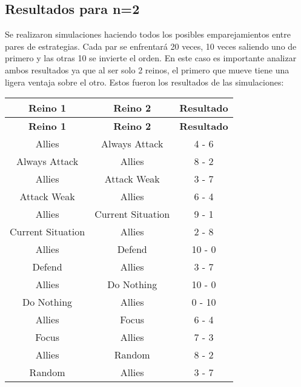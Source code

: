 \documentclass[11pt]{article}
\begin{document}
            \subsection{Resultados para n=2}
            Se realizaron simulaciones haciendo todos los posibles emparejamientos entre pares de estrategias. Cada par se enfrentará 
            20 veces, 10 veces saliendo uno de primero y las otras 10 se invierte el orden. En este caso es importante analizar ambos 
            resultados ya que al ser solo 2 reinos, el primero que mueve tiene una ligera ventaja sobre el otro. Estos fueron los 
            resultados de las simulaciones:

            \begin{longtable}{|c|c|c|}
                \hline \textbf{Reino 1}  & \textbf{Reino 2}  & \textbf{Resultado} \\ 
                \endfirsthead
                \hline \textbf{Reino 1}  & \textbf{Reino 2}  & \textbf{Resultado} \\ 
                \endhead
                \hline      Allies       &   Always Attack   &   4 - 6   \\
                \hline   Always Attack   &      Allies       &   8 - 2   \\
                \hline      Allies       &    Attack Weak    &   3 - 7   \\
                \hline    Attack Weak    &      Allies       &   6 - 4   \\
                \hline      Allies       & Current Situation &   9 - 1   \\
                \hline Current Situation &      Allies       &   2 - 8   \\
                \hline      Allies       &      Defend       &  10 - 0   \\
                \hline      Defend       &      Allies       &   3 - 7   \\
                \hline      Allies       &    Do Nothing     &  10 - 0   \\
                \hline    Do Nothing     &      Allies       &  0 - 10   \\
                \hline      Allies       &       Focus       &   6 - 4   \\
                \hline       Focus       &      Allies       &   7 - 3   \\
                \hline      Allies       &      Random       &   8 - 2   \\
                \hline      Random       &      Allies       &   3 - 7   \\

\end{longtable}
\end{document}
